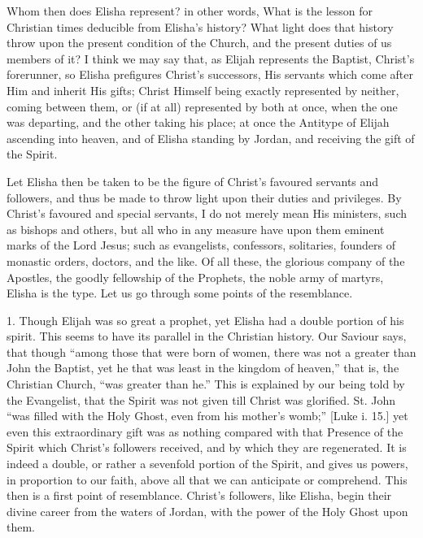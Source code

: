Whom then does Elisha represent? in other words, What is the lesson
for Christian times deducible from Elisha's history? What light does
that history throw upon the present condition of the Church, and the
present duties of us members of it? I think we may say that, as Elijah
represents the Baptist, Christ's forerunner, so Elisha prefigures
Christ's successors, His servants which come after Him and inherit His
gifts; Christ Himself being exactly represented by neither, coming
between them, or (if at all) represented by both at once, when the one
was departing, and the other taking his place; at once the Antitype of
Elijah ascending into heaven, and of Elisha standing by Jordan, and
receiving the gift of the Spirit.

Let Elisha then be taken to be the figure of Christ's favoured
servants and followers, and thus be made to throw light upon their
duties and privileges. By Christ's favoured and special servants, I do
not merely mean His ministers, such as bishops and others, but all who
in any measure have upon them eminent marks of the Lord Jesus; such as
evangelists, confessors, solitaries, founders of monastic orders,
doctors, and the like. Of all these, the glorious company of the
Apostles, the goodly fellowship of the Prophets, the noble army of
martyrs, Elisha is the type. Let us go through some points of the
resemblance.

1. Though Elijah was so great a prophet, yet Elisha had a double
portion of his spirit. This seems to have its parallel in the
Christian history. Our Saviour says, that though ``among those
that were born of women, there was not a greater than John the
Baptist, yet he that was least in the kingdom of heaven,'' that
is, the Christian Church, ``was greater than he.'' This is
explained by our being told by the Evangelist, that the Spirit was not
given till Christ was glorified. St. John ``was filled with the
Holy Ghost, even from his mother's womb;'' [Luke i. 15.] yet even
this extraordinary gift was as nothing compared with that Presence of
the Spirit which Christ's followers received, and by which they are
regenerated. It is indeed a double, or rather a sevenfold portion of
the Spirit, and gives us powers, in proportion to our faith, above all
that we can anticipate or comprehend. This then is a first point of
resemblance. Christ's followers, like Elisha, begin their divine
career from the waters of Jordan, with the power of the Holy Ghost
upon them.

